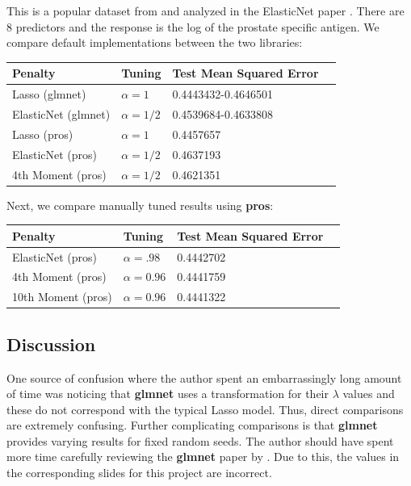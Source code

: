 \documentclass[article]{jss}
\numberwithin{equation}{section}
\begin{document}
This is a popular dataset from \cite{prostate} and analyzed in the ElasticNet paper \cite{elasticnet}.
There are 8 predictors and the response is the log of the prostate specific antigen.
We compare default implementations between the two libraries:

\begin{center}
\setlength{\tabcolsep}{20pt} %
\renewcommand{\arraystretch}{1} %
\begin{tabular}{lllp{7.4cm}}
\hline
Penalty & Tuning & Test Mean Squared Error \\ \hline
Lasso (glmnet) & $\alpha = 1$ & 0.4443432-0.4646501 \\
ElasticNet (glmnet) & $\alpha = 1/2$  & 0.4539684-0.4633808   \\
Lasso (pros) & $\alpha = 1$ &  0.4457657 \\
ElasticNet (pros) & $\alpha = 1/2$ &  0.4637193 \\
4th Moment (pros) & $\alpha = 1/2$ &  0.4621351 \\ \hline
\end{tabular}
\end{center}

Next, we compare manually tuned results using \textbf{pros}:

\begin{center}
\setlength{\tabcolsep}{20pt} %
\renewcommand{\arraystretch}{1} %
\begin{tabular}{lllp{7.4cm}}
\hline
Penalty & Tuning & Test Mean Squared Error \\ \hline
ElasticNet (pros) & $\alpha = .98$ & 0.4442702 \\
4th Moment (pros) & $\alpha = 0.96$ &  0.4441759 \\
10th Moment (pros) & $\alpha = 0.96$ &  0.4441322 \\ \hline
\end{tabular}
\end{center}

\subsection{Discussion}

One source of confusion where the author spent an embarrassingly long amount of time was noticing that \textbf{glmnet} uses a transformation for their $\lambda$ values and these do not correspond with the typical Lasso model. Thus, direct comparisons are extremely confusing. Further complicating comparisons is that \textbf{glmnet} provides varying results for fixed random seeds.
The author should have spent more time carefully reviewing the \textbf{glmnet} paper by \cite{glmnet}. Due to this, the values in the corresponding slides for this project are incorrect. 



\end{document}
